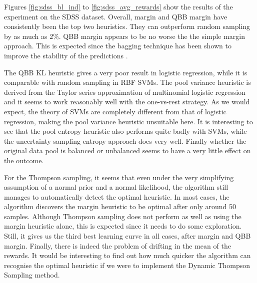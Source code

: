 Figures \ref{fig:sdss_bl_ind} to \ref{fig:sdss_avg_rewards} show the results of the experiment on
the SDSS dataset. Overall, margin and QBB margin have consistently been the top two heuristics.
They can outperform random sampling by as much as 2\%. QBB margin appears to be no worse the the
simple margin approach. This is expected since the bagging technique has been shown to improve the
stability of the predictions \cite{breiman96}.

The QBB KL heuristic gives a very poor result in logistic regression, while it is comparable with
random sampling in RBF SVMs. The pool variance heuristic is derived from the Taylor series
approximation of multinomial logistic regression and it seems to work reasonably well with the
one-vs-rest strategy. As we would expect, the theory of SVMs are completely different from that of
logistic regression, making the pool variance heuristic unsuitable here. It is interesting to see
that the pool entropy heuristic also performs quite badly with SVMs, while the uncertainty sampling
entropy approach does very well. Finally whether the original data pool is balanced or unbalanced
seems to have a very little effect on the outcome.

For the Thompson sampling, it seems that even under the very simplifying assumption of a normal
prior and a normal likelihood, the algorithm still manages to automatically detect the optimal
heuristic. In most cases, the algorithm discovers the margin heuristic to be optimal after only
around 50 samples. Although Thompson sampling does not perform as well as using the margin heuristic
alone, this is expected since it needs to do some exploration. Still, it gives us the third best
learning curve in all cases, after margin and QBB margin. Finally, there is indeed the problem of
drifting in the mean of the rewards. It would be interesting to find out how much quicker the
algorithm can recognise the optimal heuristic if we were to implement the Dynamic Thompson Sampling
method.


